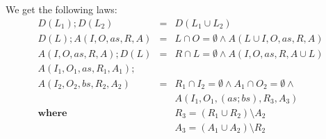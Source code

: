 We get the following laws:
\begin{eqnarray*}
   D(L_1) ; D(L_2) &=& D(L_1 \cup L_2)
%
\\ D(L) ;  A(I,O,as,R,A)
   &=&
   L\cap O = \emptyset \land A(L\cup I,O,as,R,A)
%
\\  A(I,O,as,R,A) ; D(L)
   &=&
   R\cap L = \emptyset \land A(I,O,as,R,A \cup L)
%
\\ A(I_1,O_1,as,R_1,A_1) ; {}
\\ A(I_2,O_2,bs,R_2,A_2)
   &=&
   R_1\cap I_2 = \emptyset \land 
   A_1\cap O_2 = \emptyset \land {}
\\ && A(I_1,O_1,(as;bs),R_3, A_3)
\\ \textbf{where} && R_3 = (R_1 \cup R_2) \!\setminus\! A_2
\\                && A_3 = (A_1 \cup A_2) \!\setminus\! R_2
\end{eqnarray*}



































